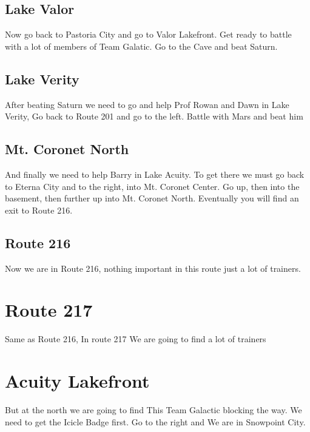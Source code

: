 \documentclass[11pt]{article}
\begin{document}
\subsection{Lake Valor}\label{subsec:lake-valor}
Now go back to Pastoria City and go to Valor Lakefront.
Get ready to battle with a lot of members of Team Galatic.
Go to the Cave and beat Saturn.





\subsection{Lake Verity}\label{subsec:lake-verity}
After beating Saturn we need to go and help Prof Rowan and Dawn in Lake Verity, Go back to Route 201 and go to the left.
Battle with Mars and beat him

\subsection{Mt. Coronet North}\label{subsec:mt.-coronet-north}
And finally we need to help Barry in Lake Acuity.
To get there we must go back to Eterna City and to the right, into Mt. Coronet Center.
Go up, then into the basement, then further up into Mt. Coronet North.
Eventually you will find an exit to Route 216.



\subsection{Route 216}\label{subsec:route-2162}
Now we are in Route 216, nothing important in this route just a lot of trainers.



\section{Route 217}\label{sec:route-217}
Same as Route 216, In route 217 We are going to find a lot of trainers




\section{Acuity Lakefront}
But at the north we are going to find This Team Galactic blocking the way.
We need to get the Icicle Badge first.
Go to the right and We are in Snowpoint City.
\end{document}

